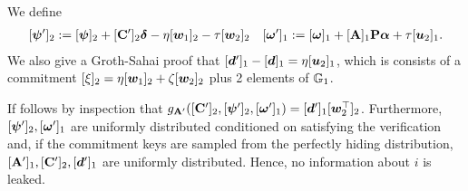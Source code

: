 We define
\begin{align}
&[{\boldsymbol{\psi}}']_2 := [{\boldsymbol{\psi}}]_2+[\mathbf{{C}}']_2{\boldsymbol{\delta}}-\eta[{\boldsymbol{w}}_1]_2-\tau[{\boldsymbol{w}}_2]_2
&[{\boldsymbol{\omega}}']_1 := [{\boldsymbol{\omega}}]_1 +[\mathbf{{A}}]_1\mathbf{{P}}{\boldsymbol{\alpha}} + \tau[{\boldsymbol{u}}_2]_1.
\label{eq:g-rerand-proofs}
\end{align}
We also give a Groth-Sahai proof  that $[{\boldsymbol{d}}']_1-[{\boldsymbol{d}}]_1 = \eta[{\boldsymbol{u}}_2]_1$, which is consists of a commitment $[\xi]_2 = \eta[{\boldsymbol{w}}_1]_2+\zeta[{\boldsymbol{w}}_2]_2$ plus 2 elements of $\mathbb{G}_1$. 

If follows by inspection that $g_{\mathbf{{A}}'}([\mathbf{{C}}']_2,[{\boldsymbol{\psi}}']_2,[{\boldsymbol{\omega}}']_1) = [{\boldsymbol{d}}']_1[{\boldsymbol{w}}_2^\top]_2$. Furthermore, $[{\boldsymbol{\psi}}']_2,[{\boldsymbol{\omega}}']_1$ are uniformly distributed conditioned on satisfying the verification and, if
the commitment keys are sampled from the perfectly hiding distribution, $[\mathbf{{A}}']_1,[\mathbf{{C}}']_2,[{\boldsymbol{d}}']_1$ are uniformly distributed. Hence, no information about $i$ is leaked.

